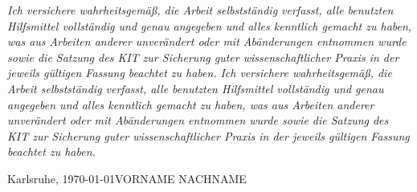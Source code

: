 \mbox{}\thispagestyle{empty}

\vspace*{1cm}

{\Large \textbf{}} 

\bigskip

{
\textit{Ich versichere wahrheitsgemäß, die Arbeit selbstständig verfasst, alle benutzten Hilfsmittel vollständig und genau angegeben und alles kenntlich gemacht zu haben, was aus Arbeiten anderer unverändert oder mit Abänderungen entnommen wurde sowie die Satzung des KIT zur Sicherung guter wissenschaftlicher Praxis in der jeweils gültigen Fassung beachtet zu haben.}}
{
\textit{Ich versichere wahrheitsgemäß, die Arbeit selbstständig verfasst, alle benutzten Hilfsmittel vollständig und genau angegeben und alles kenntlich gemacht zu haben, was aus Arbeiten anderer unverändert oder mit Abänderungen entnommen wurde sowie die Satzung des KIT zur Sicherung guter wissenschaftlicher Praxis in der jeweils gültigen Fassung beachtet zu haben.}}

\vspace{1cm}

%
%
%
%
Karlsruhe, \today \hfill VORNAME NACHNAME


